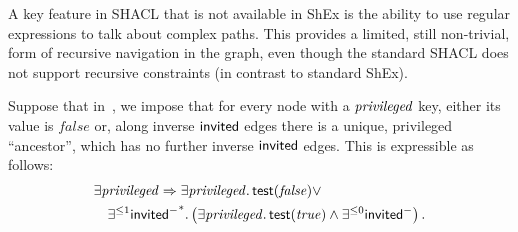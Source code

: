 A key feature in SHACL that is not available in ShEx is the ability to use
regular expressions to talk about complex paths.
This provides a limited, still non-trivial, form of recursive navigation in the
graph, even though the standard SHACL does not support recursive constraints
(in contrast to standard ShEx).

\begin{example}
  \label{ex:fancy-shacl-paths}
  Suppose that in~, we impose that for every node with a
  $\mathit{privileged}$ key, either its value is $\mathit{false}$ or, along inverse
  $\mathsf{invited}$ edges there is a unique, privileged ``ancestor'', which has no
  further inverse  $\mathsf{invited}$ edges.
  This is expressible as follows:
  \begin{align*}
    & \exists \mathit{privileged} \Rightarrow \exists \mathit{privileged} \ldotp
      \mathsf{test}(\mathit{false}) \lor \\
    & \quad \exists^{\leq 1} {\mathsf{invited}^{-}}^{*} \ldotp \big( \exists
      \mathit{privileged} \ldotp \mathsf{test}(\mathit{true}) \land \exists^{\leq 0}
      \mathsf{invited}^{-}  \big) \,.
  \end{align*}
\end{example}



